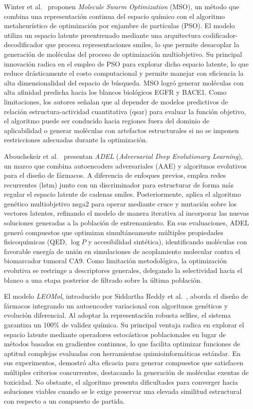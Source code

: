 Winter et al.~\cite{WMS+19} proponen \textit{Molecule Swarm Optimization} (MSO), un método que combina una representación continua del espacio químico con el algoritmo metaheurístico de optimización por enjambre de partículas (PSO). El modelo utiliza un espacio latente preentrenado mediante una arquitectura codificador-decodificador que procesa representaciones \gls{smiles}, lo que permite desacoplar la generación de moléculas del proceso de optimización multiobjetivo. Su principal innovación radica en el empleo de PSO para explorar dicho espacio latente, lo que reduce drásticamente el costo computacional y permite manejar con eficiencia la alta dimensionalidad del espacio de búsqueda. MSO logró generar moléculas con alta afinidad predicha hacia los blancos biológicos EGFR y BACE1. Como limitaciones, los autores señalan que al depender de modelos predictivos de relación estructura-actividad cuantitativa (\gls{qsar}) para evaluar la función objetivo, el algoritmo puede ser conducido hacia regiones fuera del dominio de aplicabilidad o generar moléculas con artefactos estructurales si no se imponen restricciones adecuadas durante la optimización.

Abouchekeir et al.~\cite{AVM+22} presentan \textit{ADEL} (\textit{Adversarial Deep Evolutionary Learning}), un marco que combina autoencoders adversariales (AAE) y algoritmos evolutivos para el diseño de fármacos. A diferencia de enfoques previos, emplea redes recurrentes (\gls{lstm}) junto con un discriminador para estructurar de forma más regular el espacio latente de cadenas \gls{smiles}. Posteriormente, aplica el algoritmo genético multiobjetivo \gls{nsga2} para operar mediante cruce y mutación sobre los vectores latentes, refinando el modelo de manera iterativa al incorporar las nuevas soluciones generadas a la población de entrenamiento. En sus evaluaciones, ADEL generó compuestos que optimizan simultáneamente múltiples propiedades fisicoquímicas (QED, $\log P$ y accesibilidad sintética), identificando moléculas con favorable energía de unión en simulaciones de acoplamiento molecular contra el biomarcador tumoral CA9. Como limitación metodológica, la optimización evolutiva se restringe a descriptores generales, delegando la selectividad hacia el blanco a una etapa posterior de filtrado sobre la última población.

El modelo \textit{LEOMol}, introducido por Siddartha Reddy et al.~\cite{NGM+24}, aborda el diseño de fármacos integrando un autoencoder variacional con algoritmos genéticos y evolución diferencial. Al adoptar la representación robusta \gls{selfies}, el sistema garantiza un 100\% de validez química. Su principal ventaja radica en explorar el espacio latente mediante operadores estocásticos poblacionales en lugar de métodos basados en gradientes continuos, lo que facilita optimizar funciones de aptitud complejas evaluadas con herramientas quimioinformáticas estándar. En sus experimentos, demostró alta eficacia para generar compuestos que satisfacen múltiples criterios concurrentes, destacando la generación de moléculas exentas de toxicidad. No obstante, el algoritmo presenta dificultades para converger hacia soluciones viables cuando se le exige preservar una elevada similitud estructural con respecto a un compuesto de partida.


